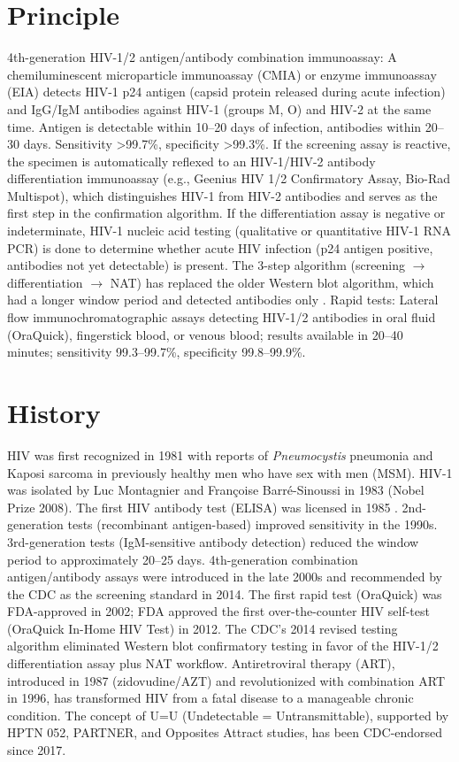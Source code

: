 \section*{Principle}
4th-generation HIV-1/2 antigen/antibody combination immunoassay: A chemiluminescent microparticle immunoassay (CMIA) or enzyme immunoassay (EIA) detects HIV-1 p24 antigen (capsid protein released during acute infection) and IgG/IgM antibodies against HIV-1 (groups M, O) and HIV-2 at the same time. Antigen is detectable within 10--20 days of infection, antibodies within 20--30 days. Sensitivity >99.7\%, specificity >99.3\%. If the screening assay is reactive, the specimen is automatically reflexed to an HIV-1/HIV-2 antibody differentiation immunoassay (e.g., Geenius HIV 1/2 Confirmatory Assay, Bio-Rad Multispot), which distinguishes HIV-1 from HIV-2 antibodies and serves as the first step in the confirmation algorithm. If the differentiation assay is negative or indeterminate, HIV-1 nucleic acid testing (qualitative or quantitative HIV-1 RNA PCR) is done to determine whether acute HIV infection (p24 antigen positive, antibodies not yet detectable) is present. The 3-step algorithm (screening $\rightarrow$ differentiation $\rightarrow$ NAT) has replaced the older Western blot algorithm, which had a longer window period and detected antibodies only \cite{branson2014laboratory}. Rapid tests: Lateral flow immunochromatographic assays detecting HIV-1/2 antibodies in oral fluid (OraQuick), fingerstick blood, or venous blood; results available in 20--40 minutes; sensitivity 99.3--99.7\%, specificity 99.8--99.9\%.

\section*{History}
HIV was first recognized in 1981 with reports of \textit{Pneumocystis} pneumonia and Kaposi sarcoma in previously healthy men who have sex with men (MSM). HIV-1 was isolated by Luc Montagnier and Françoise Barré-Sinoussi in 1983 (Nobel Prize 2008). The first HIV antibody test (ELISA) was licensed in 1985 \cite{alexander2016human}. 2nd-generation tests (recombinant antigen-based) improved sensitivity in the 1990s. 3rd-generation tests (IgM-sensitive antibody detection) reduced the window period to approximately 20--25 days. 4th-generation combination antigen/antibody assays were introduced in the late 2000s and recommended by the CDC as the screening standard in 2014. The first rapid test (OraQuick) was FDA-approved in 2002; FDA approved the first over-the-counter HIV self-test (OraQuick In-Home HIV Test) in 2012. The CDC's 2014 revised testing algorithm eliminated Western blot confirmatory testing in favor of the HIV-1/2 differentiation assay plus NAT workflow. Antiretroviral therapy (ART), introduced in 1987 (zidovudine/AZT) and revolutionized with combination ART in 1996, has transformed HIV from a fatal disease to a manageable chronic condition. The concept of U=U (Undetectable = Untransmittable), supported by HPTN 052, PARTNER, and Opposites Attract studies, has been CDC-endorsed since 2017.

